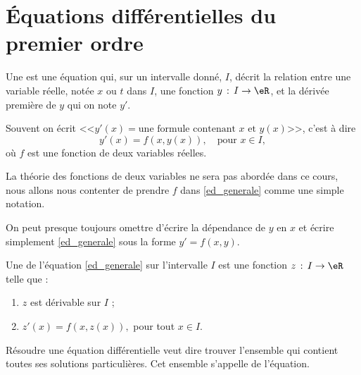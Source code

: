 
\section{Équations différentielles du premier ordre}

\begin{definition}
	Une   est une équation qui, sur un intervalle donné, \(I\), décrit la relation entre une variable réelle, notée \(x\) ou \(t\) dans \(I\), une fonction \(y \,:\,I\to\eR \), et la dérivée première de \(y\) qui on note \(y'\).
\end{definition}
Souvent on écrit <<\(y'(x) = \text{une formule contenant }x \text{ et }y(x)\)>>, c'est \`a dire
\begin{equation}\label{ed_generale}
	y'(x) = f(x,y(x)),\quad\text{pour }x\in I,
\end{equation}
où \(f\) est une fonction de deux variables réelles.
\begin{remark}
	La théorie des fonctions de deux variables ne sera pas abordée dans ce cours, nous allons nous contenter de prendre \(f\) dans \eqref{ed_generale} comme une simple notation.
\end{remark}
On peut presque toujours omettre d'écrire la dépendance de \(y\) en \(x\) et écrire simplement \eqref{ed_generale} sous la forme \(y' = f(x,y)\).
\begin{definition}
	Une  de l'équation \eqref{ed_generale} sur l'intervalle \(I\) est une fonction \(z\,:\, I\to\eR\) telle que :
	\begin{enumerate}
		\item \(z\) est dérivable sur \(I\) ;
		\item \(z'(x) = f(x, z(x)), \) pour tout \(x\in I\).
	\end{enumerate}
\end{definition}
\begin{definition}
	Résoudre une équation différentielle veut dire trouver l'ensemble qui contient toutes ses solutions particulières. Cet ensemble s'appelle  de l'équation.
\end{definition}
